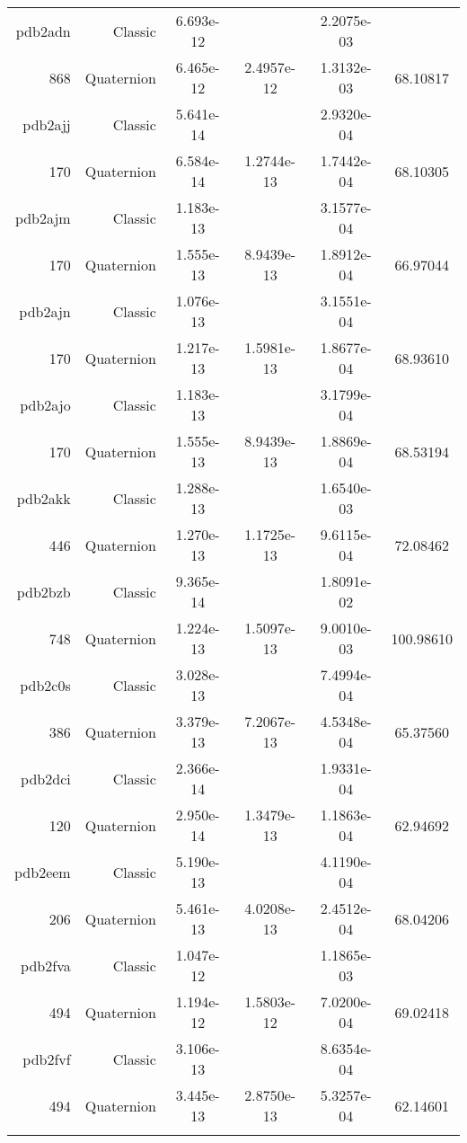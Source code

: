 \begin{xltabular}{\textwidth}{r|rS[table-format=1.3e+2]S[table-format=1.4e+2]S[table-format=1.4e+2]S[table-format=-1.5]}
pdb2adn & Classic & 6.693e-12 &  & 2.2075e-03 & \\
868 & Quaternion & 6.465e-12 & 2.4957e-12 & 1.3132e-03 & 68.10817\\  \addlinespace
pdb2ajj & Classic & 5.641e-14 &  & 2.9320e-04 & \\
170 & Quaternion & 6.584e-14 & 1.2744e-13 & 1.7442e-04 & 68.10305\\  \addlinespace
pdb2ajm & Classic & 1.183e-13 &  & 3.1577e-04 & \\
170 & Quaternion & 1.555e-13 & 8.9439e-13 & 1.8912e-04 & 66.97044\\  \addlinespace
pdb2ajn & Classic & 1.076e-13 &  & 3.1551e-04 & \\
170 & Quaternion & 1.217e-13 & 1.5981e-13 & 1.8677e-04 & 68.93610\\  \addlinespace
pdb2ajo & Classic & 1.183e-13 &  & 3.1799e-04 & \\
170 & Quaternion & 1.555e-13 & 8.9439e-13 & 1.8869e-04 & 68.53194\\  \addlinespace
pdb2akk & Classic & 1.288e-13 &  & 1.6540e-03 & \\
446 & Quaternion & 1.270e-13 & 1.1725e-13 & 9.6115e-04 & 72.08462\\  \addlinespace
pdb2bzb & Classic & 9.365e-14 &  & 1.8091e-02 & \\
748 & Quaternion & 1.224e-13 & 1.5097e-13 & 9.0010e-03 & 100.98610\\  \addlinespace
pdb2c0s & Classic & 3.028e-13 &  & 7.4994e-04 & \\
386 & Quaternion & 3.379e-13 & 7.2067e-13 & 4.5348e-04 & 65.37560\\  \addlinespace
pdb2dci & Classic & 2.366e-14 &  & 1.9331e-04 & \\
120 & Quaternion & 2.950e-14 & 1.3479e-13 & 1.1863e-04 & 62.94692\\  \addlinespace
pdb2eem & Classic & 5.190e-13 &  & 4.1190e-04 & \\
206 & Quaternion & 5.461e-13 & 4.0208e-13 & 2.4512e-04 & 68.04206\\  \addlinespace
pdb2fva & Classic & 1.047e-12 &  & 1.1865e-03 & \\
494 & Quaternion & 1.194e-12 & 1.5803e-12 & 7.0200e-04 & 69.02418\\  \addlinespace
pdb2fvf & Classic & 3.106e-13 &  & 8.6354e-04 & \\
494 & Quaternion & 3.445e-13 & 2.8750e-13 & 5.3257e-04 & 62.14601\\  \addlinespace

\end{xltabular}
